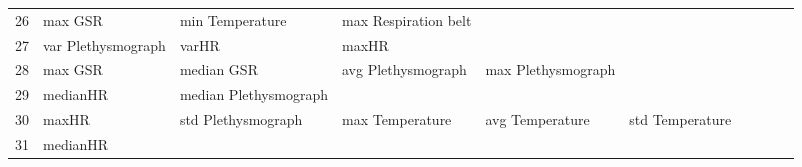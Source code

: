 \begin{landscape}
\begin{table}[]
\begin{tabular}{l|llllllll}
26       & max GSR                 & min Temperature       & max Respiration belt    &                         &                         &                       &                      &          &                      &        \\
27       & var Plethysmograph      & varHR                 & maxHR                   &                         &                         &                       &                      &          &                      &        \\
28       & max GSR                 & median GSR            & avg Plethysmograph      & max Plethysmograph      &                         &                       &                      &          &                      &        \\
29       & medianHR                & median Plethysmograph &                         &                         &                         &                       &                      &          &                      &        \\
30       & maxHR                   & std Plethysmograph    & max Temperature         & avg Temperature         & std Temperature         &                       &                      &          &                      &        \\
31       & medianHR                &                       &                         &                         &                         &                       &                      &          &                      &        \\
\end{tabular}
\end{table}
\end{landscape}
\clearpage
